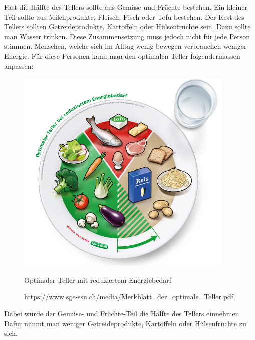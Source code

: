 Fast die Hälfte des Tellers sollte aus Gemüse und Früchte bestehen. Ein kleiner Teil sollte aus Milchprodukte, Fleisch, Fisch oder Tofu bestehen. Der Rest des Tellers sollten Getreideprodukte, Kartoffeln oder Hülsenfrüchte sein. Dazu sollte man Wasser trinken.
\newline
Diese Zusammensetzung muss jedoch nicht für jede Person stimmen. Menschen, welche sich im Alltag wenig bewegen verbrauchen weniger Energie. Für diese Personen kann man den optimalen Teller folgendermassen anpassen:
\newline
\begin{figure}[!hbpt]
  \centering
  \includegraphics[width=0.5\linewidth]{./images/optimale_teller_energie.png}
  \caption{Optimaler Teller mit reduziertem Energiebedarf}
  \label{fig:teller_2}
  \caption*{\url{https://www.sge-ssn.ch/media/Merkblatt_der_optimale_Teller.pdf}}
\end{figure}
\newline
Dabei würde der Gemüse- und Früchte-Teil die Hälfte des Tellers einnehmen. Dafür nimmt man weniger Getreideprodukte, Kartoffeln oder Hülsenfrüchte zu sich.
